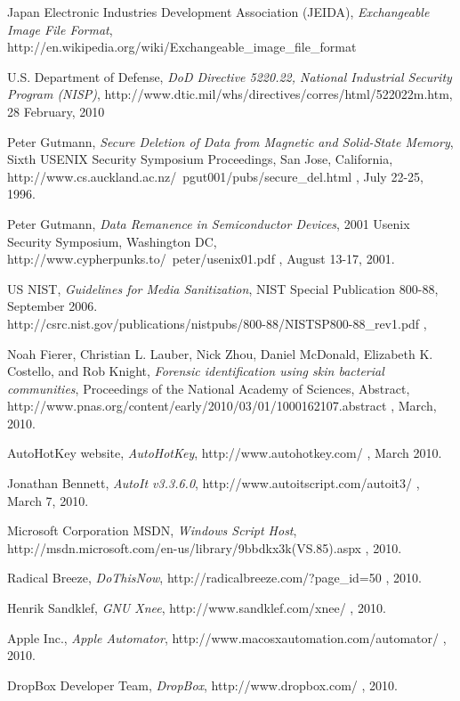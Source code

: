 \documentclass[runningheads,english]{llncs}
\begin{document}
{\begin{thebibliography}{1}
Japan Electronic Industries Development Association (JEIDA), \emph{Exchangeable
Image File Format},
http://en.wikipedia.org/wiki/Exchangeable\_image\_file\_format

U.S. Department of Defense, \emph{DoD Directive 5220.22, National Industrial
Security Program (NISP)},
http://www.dtic.mil/whs/directives/corres/html/522022m.htm, 28 February, 2010

Peter Gutmann, \emph{Secure Deletion of Data from Magnetic and Solid-State
Memory}, Sixth USENIX Security Symposium Proceedings, San Jose, California,
http://www.cs.auckland.ac.nz/~pgut001/pubs/secure\_del.html , July 22-25, 1996.

Peter Gutmann, \emph{Data Remanence in Semiconductor Devices}, 2001 Usenix
Security Symposium, Washington DC, http://www.cypherpunks.to/~peter/usenix01.pdf
, August 13-17, 2001.

US NIST, \emph{Guidelines for Media Sanitization}, NIST Special Publication
800-88, September  2006.
\\http://csrc.nist.gov/publications/nistpubs/800-88/NISTSP800-88\_rev1.pdf , 

Noah Fierer, Christian L. Lauber, Nick Zhou, Daniel McDonald, Elizabeth K.
Costello, and Rob Knight, \emph{Forensic identification using skin bacterial
communities}, Proceedings of the National Academy of Sciences, Abstract,
http://www.pnas.org/content/early/2010/03/01/1000162107.abstract , March, 2010.

AutoHotKey website, \emph{AutoHotKey}, http://www.autohotkey.com/ , March 2010.

Jonathan Bennett, \emph{AutoIt v3.3.6.0}, http://www.autoitscript.com/autoit3/ ,
March 7, 2010.

Microsoft Corporation MSDN, \emph{Windows Script Host},
http://msdn.microsoft.com/en-us/library/9bbdkx3k(VS.85).aspx , 2010.

Radical Breeze, \emph{DoThisNow}, http://radicalbreeze.com/?page\_id=50 , 2010.

Henrik Sandklef, \emph{GNU Xnee}, http://www.sandklef.com/xnee/ , 2010.

Apple Inc., \emph{Apple Automator}, http://www.macosxautomation.com/automator/ 
, 2010.

DropBox Developer Team, \emph{DropBox}, http://www.dropbox.com/ , 2010.


\end{thebibliography}}
\end{document}
